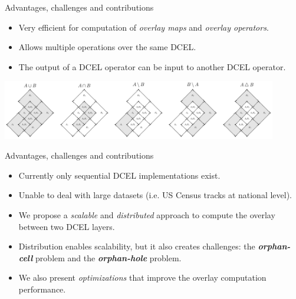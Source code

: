 \documentclass{beamer}
\begin{document}
    \begin{frame}{Advantages, challenges and contributions}
        \begin{itemize}
            \item Very efficient for computation of \textit{overlay maps} and \textit{overlay operators}.
            \item Allows multiple operations over the same DCEL.
            \item The output of a DCEL operator can be input to another DCEL operator.
             
        \end{itemize}
        \vspace{0.25cm}

        \centering
        \includegraphics[width=0.9\textwidth]{figures/dcel_operators}        
    \end{frame}

    \begin{frame}{Advantages, challenges and contributions}
        \begin{itemize}
    
            \item Currently only sequential DCEL implementations exist.
            \item Unable to deal with large datasets (i.e. US Census tracks at national level).
            \item We propose a \textit{scalable} and \textit{distributed} approach to compute the overlay between two DCEL layers.
            \item Distribution enables scalability, but it also creates challenges: the \textbf{\textit{orphan-cell}} problem and the \textbf{\textit{orphan-hole}} problem.
            \item We also present \textit{optimizations} that improve the overlay computation performance.  
        \end{itemize}
   
    \end{frame}
    
\end{document}
